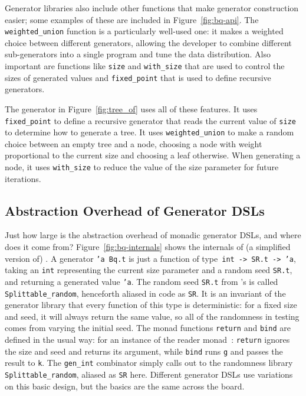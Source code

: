 \documentclass[acmsmall]{acmart}
\theoremstyle{definition}
\begin{document}
Generator libraries also include other functions that make generator
construction easier; some examples of these are included in
Figure~\ref{fig:bq-api}.  The \texttt{weighted\_union} function is a
particularly well-used one: it makes a weighted choice between different
generators, allowing the developer to combine different sub-generators into a
single program and tune the data distribution. Also important are functions like
\texttt{size} and \texttt{with\_size} that are used to control the sizes of
generated values and \texttt{fixed\_point} that is used to define recursive
generators.

The generator in Figure~\ref{fig:tree_of} uses all of these
features. It uses \texttt{fixed\_point} to define a recursive generator that
reads the current value of \texttt{size} to determine how to generate a tree.
It uses \texttt{weighted\_union} to make a random choice between an
empty tree and a node, choosing a node with weight proportional to the current
size and choosing a leaf otherwise. When generating a node, it uses
\texttt{with\_size} to reduce the value of the size parameter for future
iterations.

\subsection{Abstraction Overhead of Generator DSLs}
Just how large is the abstraction overhead of monadic generator DSLs, and where does it come from?
Figure~\ref{fig:bq-internals} shows the internals of (a simplified version of) \bq{}.
A generator \texttt{'a Bq.t} is just a function of type~\texttt{int -> SR.t -> 'a},
taking an \texttt{int} representing the current size parameter and a random seed \texttt{SR.t},
and returning a generated value \texttt{'a}.
The random seed \texttt{SR.t} from \bq's \rand{} is called \texttt{Splittable\_random}, henceforth aliased in code as \texttt{SR}.
It is an invariant of the generator library that every function of this type is
deterministic: for a fixed size and seed, it will always return the same value, so all of the randomness in testing comes from varying the initial seed.
The monad functions \texttt{return} and \texttt{bind} are defined in the usual way:
for an instance of the reader monad~\cite{moggi91}: \texttt{return} ignores the size and seed and returns its argument, while \texttt{bind} runs \texttt{g} and passes the result to \texttt{k}.
The \texttt{gen\_int} combinator simply calls out to the randomness library \texttt{Splittable\_random}, aliased as \texttt{SR} here.
Different generator DSLs use variations on this basic design, but the basics are the same across the board.
\end{document}
